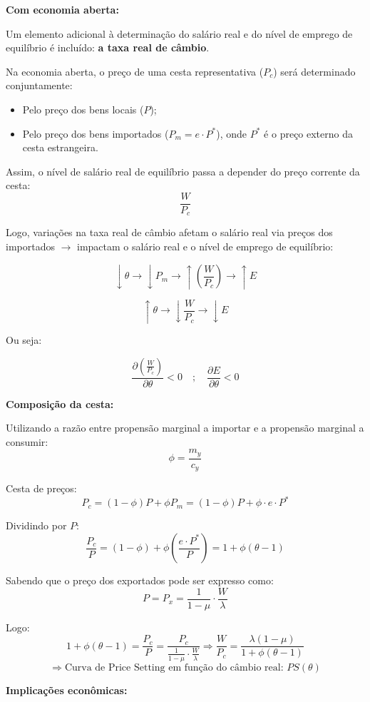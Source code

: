 \documentclass[a4paper,12pt]{article}[abntex2]
\begin{document}
\textbf{Com economia aberta:}

Um elemento adicional à determinação do salário real e do nível de emprego de equilíbrio é incluído: \textbf{a taxa real de câmbio}.

Na economia aberta, o preço de uma cesta representativa ($P_c$) será determinado conjuntamente:
\begin{itemize}
  \item Pelo preço dos bens locais ($P$);
  \item Pelo preço dos bens importados ($P_m = e \cdot P^*$), onde $P^*$ é o preço externo da cesta estrangeira.
\end{itemize}

Assim, o nível de salário real de equilíbrio passa a depender do preço corrente da cesta:
\[
\frac{W}{P_c}
\]

Logo, variações na taxa real de câmbio afetam o salário real via preços dos importados $\rightarrow$ impactam o salário real e o nível de emprego de equilíbrio:

\[
\downarrow \theta \rightarrow \downarrow P_m \rightarrow \uparrow \left( \frac{W}{P_c} \right) \rightarrow \uparrow E
\]

\[
\uparrow \theta \rightarrow \downarrow \frac{W}{P_c} \rightarrow \downarrow E
\]

Ou seja:

\[
\frac{\partial \left( \frac{W}{P_c} \right)}{\partial \theta} < 0 
\quad ; \quad
\frac{\partial E}{\partial \theta} < 0
\]


\textbf{Composição da cesta:}

Utilizando a razão entre propensão marginal a importar e a propensão marginal a consumir:
\[
\phi = \frac{m_y}{c_y}
\]

Cesta de preços:
\[
P_c = (1 - \phi) P + \phi P_m = (1 - \phi) P + \phi \cdot e \cdot P^*
\]

Dividindo por $P$:
\[
\frac{P_c}{P} = (1 - \phi) + \phi \left( \frac{e \cdot P^*}{P} \right)
= 1 + \phi(\theta - 1)
\]


Sabendo que o preço dos exportados pode ser expresso como:
\[
P = P_x = \frac{1}{1 - \mu} \cdot \frac{W}{\lambda}
\]

Logo:
\[
1 + \phi(\theta - 1) = \frac{P_c}{P} = \frac{P_c}{\frac{1}{1 - \mu} \cdot \frac{W}{\lambda}}
\Rightarrow
\frac{W}{P_c} = \frac{\lambda (1 - \mu)}{1 + \phi(\theta - 1)}
\]
\[
\Rightarrow \text{Curva de Price Setting em função do câmbio real: } PS(\theta)
\]


\textbf{Implicações econômicas:}
\end{document}
